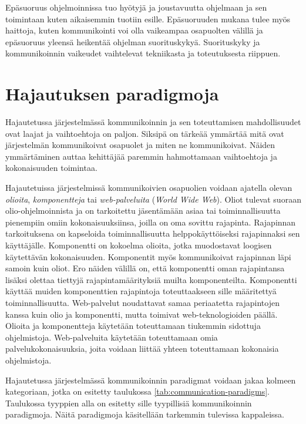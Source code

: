 Epäsuoruus ohjelmoinnissa tuo hyötyjä ja joustavuutta ohjelmaan ja sen toimintaan kuten aikaisemmin tuotiin esille. Epäsuoruuden mukana tulee myös haittoja, kuten kommunikointi voi olla vaikeampaa osapuolten välillä ja epäsuoruus yleensä heikentää ohjelman suorituskykyä. Suorituskyky ja kommunikoinnin vaikeudet vaihtelevat tekniikasta ja toteutuksesta riippuen.

\section{Hajautuksen paradigmoja}
Hajautetussa järjestelmässä kommunikoinnin ja sen toteuttamisen mahdollisuudet ovat laajat ja vaihtoehtoja on paljon. Siksipä on tärkeää ymmärtää mitä ovat järjestelmän kommunikoivat osapuolet ja miten ne kommunikoivat. Näiden ymmärtäminen auttaa kehittäjää paremmin hahmottamaan vaihtoehtoja ja kokonaisuuden toimintaa.

Hajautetuissa järjestelmissä kommunikoivien osapuolien voidaan ajatella olevan \emph{olioita}, \emph{komponentteja} tai \emph{web-palveluita} (\emph{World Wide Web}). Oliot tulevat suoraan olio-oh\-jel\-moin\-nis\-ta ja on tarkoitettu jäsentämään asiaa tai toiminnallisuutta pienempiin omiin kokonaisuuksiinsa, joilla on oma sovittu rajapinta. Rajapinnan tarkoituksena on kapseloida toiminnallisuutta helppokäyttöiseksi rajapinnaksi sen käyttäjälle. Komponentti on kokoelma olioita, jotka muodostavat loogisen käytettävän kokonaisuuden. Komponentit myös kommunikoivat rajapinnan läpi samoin kuin oliot. Ero näiden välillä on, että komponentti oman rajapintansa lisäksi olettaa tiettyjä rajapintamäärityksiä muilta komponenteilta. Komponentti käyttää muiden komponenttien rajapintoja toteuttaakseen sille määritettyä toiminnallisuutta. Web-palvelut noudattavat samaa periaatetta rajapintojen kanssa kuin olio ja komponentti, mutta toimivat web-teknologioiden päällä. Olioita ja komponentteja käytetään toteuttamaan tiukemmin sidottuja ohjelmistoja. Web-palveluita käytetään toteuttamaan omia palvelukokonaisuuksia, joita voidaan liittää yhteen toteuttamaan kokonaisia ohjelmistoja. \mbox{\cite[s.~42--43]{distributed-systems-concepts-and-design}}

Hajautetussa järjestelmässä kommunikoinnin paradigmat voidaan jakaa kolmeen kategoriaan, jotka on esitetty taulukossa \ref{tab:communication-paradigms}. Taulukossa tyyppien alla on esitetty sille tyypillisiä kommunikoinnin paradigmoja. Näitä paradigmoja käsitellään tarkemmin tulevissa kappaleissa.

